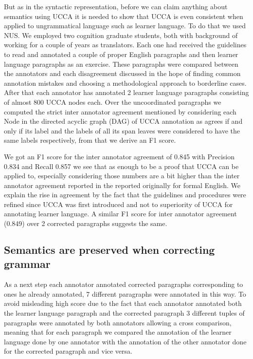 \documentclass[english]{article}
\begin{document}
{But as in the syntactic representation, before we can claim anything
about semantics using UCCA it is needed to show that UCCA is even
consistent when applied to ungrammatical language such as learner
language. To do that we used NUS\cite{dahlmeier2013building}. We employed two cognition graduate students, both
with background of working for a couple of years as translators. Each
one had received the guidelines to read and annotated a couple of
proper English paragraphs and then learner language paragraphs as
an exercise. These paragraphs were compared between the annotators
and each disagreement discussed in the hope of finding common annotation
mistakes and choosing a methodological approach to borderline cases.
After that each annotator has annotated 2 learner language paragraphs
consisting of almost 800 UCCA nodes each. Over the uncoordinated paragraphs
we computed the strict inter annotator agreement mentioned by \cite{abend2013universal}
considering each Node in the directed acyclic graph (DAG) of UCCA
annotation as agrees if and only if its label and the labels of all
its span leaves were considered to have the same labels respectively,
from that we derive an F1 score. 

We got an F1 score for the inter annotator agreement of 0.845 with
Precision 0.834 and Recall 0.857 we see that as enough to be a proof
that UCCA can be applied to, especially considering those numbers
are a bit higher than the inter annotator agreement reported in the
reported originally for formal English\cite{abend2013universal}.
We explain the rise in agreement by the fact that the guidelines and
procedures were refined since UCCA was first introduced and not to
superiority of UCCA for annotating learner language. A similar F1
score for inter annotator agreement (0.849) over 2 corrected paragraphs
suggests the same.

\subsection{Semantics are preserved when correcting grammar}

As a next step each annotator annotated corrected paragraphs corresponding
to ones he already annotated, 7 different paragraphs were annotated
in this way. To avoid misleading high score due to the fact that each
annotator annotated both the learner language paragraph and the corrected
paragraph 3 different tuples of paragraphs were annotated by both
annotators allowing a cross comparison, meaning that for each paragraph
we compared the annotation of the learner language done by one annotator
with the annotation of the other annotator done for the corrected
paragraph and vice versa. 

}
\end{document}
